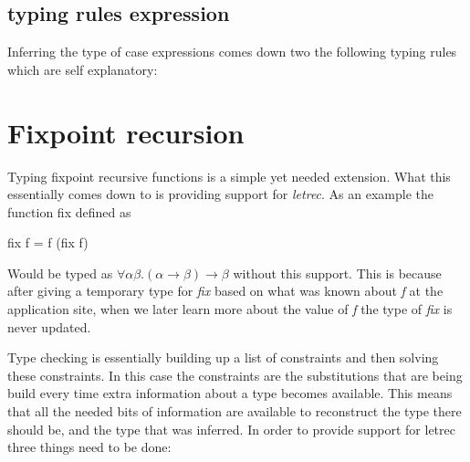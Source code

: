 \subsection{typing rules expression}
Inferring the type of case expressions comes down two the following typing rules which are self explanatory:

\begin{prooftree}
\end{prooftree}

\begin{prooftree}
\end{prooftree} 
\section{Fixpoint recursion}
Typing fixpoint recursive functions is a simple yet needed extension. What this essentially comes down to is providing support for \emph{letrec}. As an example the function fix defined as

\begin{code}
fix f = f (fix f)
\end{code} 

Would be typed as $\forall \alpha \beta. (\alpha \rightarrow \beta) \rightarrow \beta$ without this support. This is because after giving a temporary type for \emph{fix} based on what was known about \emph{f} at the application site, when we later learn more about the value of \emph{f} the type of \emph{fix} is never updated.

Type checking is essentially building up a list of constraints and then solving these constraints. In this case the constraints are the substitutions that are being build every time extra information about a type becomes available.
This means that all the needed bits of information are available to reconstruct the type there should be, and the type that was inferred. In order to provide support for letrec three things need to be done:

